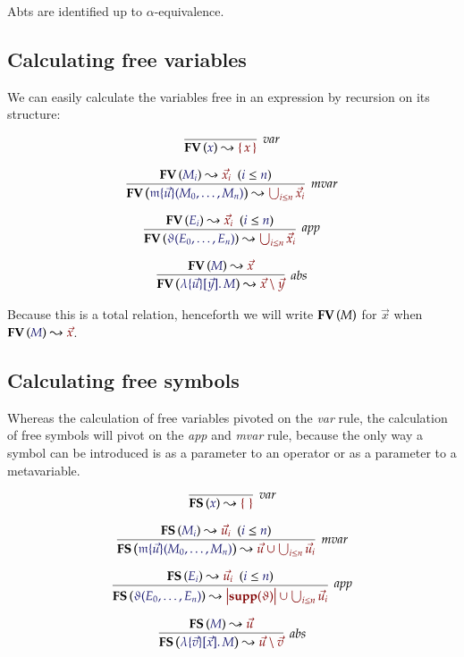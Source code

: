 \documentclass[11pt]{article}
\theoremstyle{definition}
\theoremstyle{remark}
\numberwithin{equation}{section}
\newcommand\Supp[1]{\mathbf{supp}(#1)}
\newcommand\CalcFV[2]{
  \FV{\IMode{#1}}\leadsto \OMode{#2}
}
\newcommand\CalcFS[2]{
  \FS{\IMode{#1}}\leadsto \OMode{#2}
}
\begin{document}
Abts are identified up to $\alpha$-equivalence.

\subsection{Calculating free variables}

We can easily calculate the variables free in an expression by recursion on its
structure:

\begin{gather*}
  \infer[\textit{var}]{
    \CalcFV{x}{\MkSet{x}}
  }{
  }\\[6pt]
  \infer[\textit{mvar}]{
    \CalcFV{
      \MApp{\MV{m}}{\vec{u}}{M_0,\dots,M_n}
    }{
      \bigcup_{i\leq n} \vec{x}_i
    }
  }{
    \HypJ{
      \CalcFV{M_i}{\vec{x}_i}
    }{
      \Leq{i}{n}
    }
  }\\[6pt]
  \infer[\textit{app}]{
    \CalcFV{
      \App{\vartheta}{E_0,\dots,E_n}
    }{
      \bigcup_{i\leq n} \vec{x}_i
    }
  }{
    \HypJ{
      \CalcFV{E_i}{\vec{x}_i}
    }{
      \Leq{i}{n}
    }
  }\\[6pt]
  \infer[\textit{abs}]{
    \CalcFV{
      \MkBTm{\vec{u}}{\vec{y}}{M}
    }{
      \vec{x}\setminus\vec{y}
    }
  }{
    \CalcFV{M}{\vec{x}}
  }
\end{gather*}

Because this is a total relation, henceforth we will write $\mathbf{FV}\left(M\right)$ for
$\vec{x}$ when $\CalcFV{M}{\vec{x}}$.

\subsection{Calculating free symbols}

Whereas the calculation of free variables pivoted on the \emph{var} rule, the
calculation of free symbols will pivot on the \emph{app} and \emph{mvar} rule,
because the only way a symbol can be introduced is as a parameter to an
operator or as a parameter to a metavariable.

\begin{gather*}
  \infer[\textit{var}]{
    \CalcFS{x}{\MkSet{}}
  }{
  }\\[6pt]
  \infer[\textit{mvar}]{
    \CalcFS{
      \MApp{\MV{m}}{\vec{u}}{M_0,\dots,M_n}
    }{
      \vec{u} \cup \bigcup_{i\leq n} \vec{u}_i
    }
  }{
    \HypJ{
      \CalcFS{M_i}{\vec{u}_i}
    }{
      \Leq{i}{n}
    }
  }\\[6pt]
  \infer[\textit{app}]{
    \CalcFS{
      \App{\vartheta}{E_0,\dots,E_n}
    }{
      \Dom{\Supp{\vartheta}} \cup \bigcup_{i\leq n} \vec{u}_i
    }
  }{
    \HypJ{
      \CalcFS{E_i}{\vec{u}_i}
    }{
      \Leq{i}{n}
    }
  }\\[6pt]
  \infer[\textit{abs}]{
    \CalcFS{
      \MkBTm{\vec{v}}{\vec{x}}{M}
    }{
      \vec{u}\setminus\vec{v}
    }
  }{
    \CalcFS{M}{\vec{u}}
  }
\end{gather*}
\end{document}
